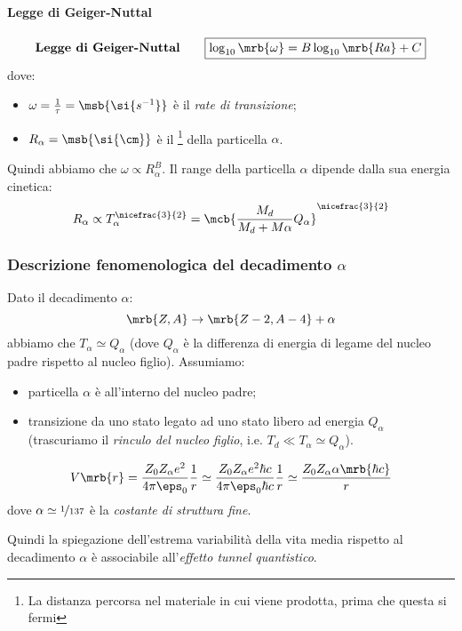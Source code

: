 \paragraph{Legge di Geiger-Nuttal}
\[
  \textbf{Legge di Geiger-Nuttal}\qquad
  \boxed{
    \log_{10} \mrb{\omega} = B \log _{10} \mrb{Ra} + C
  }
\]
dove:
\begin{itemize}
  \item $\omega = \frac{1}{\tau} = \msb{\si{s^{-1}}}$ è il \textit{rate di
    transizione};
  \item $R _{\alpha} = \msb{\si{\cm}}$ è il \textit{}\footnote{
      La distanza percorsa nel materiale in cui viene prodotta, prima che
      questa si fermi
    } della particella $\alpha$.
\end{itemize}
Quindi abbiamo che $\omega \propto R _{\alpha}^{B}$. %
Il range della particella $\alpha$ dipende dalla sua energia cinetica:
\[
  R _{\alpha} \propto T _{\alpha}^{\nicefrac{3}{2}} = \mcb{\frac{M _{d}}{M _{d}
  + M \alpha} Q _{\alpha}}^{\nicefrac{3}{2}}
\]

\subsubsection{Descrizione fenomenologica del decadimento $\alpha$}
Dato il decadimento $\alpha$:
\[
  \mrb{Z, A} \rightarrow \mrb{Z - 2, A - 4} + \alpha
\]
abbiamo che $T _{\alpha} \simeq Q _{\alpha}$ (dove $Q _{\alpha}$ è la
differenza di energia di legame del nucleo padre rispetto al nucleo figlio).
Assumiamo:
\begin{itemize}
  \item particella $\alpha$ è \textit{} all'interno del
    nucleo padre;
  \item transizione da uno stato legato ad uno stato libero ad energia $Q
    _{\alpha}$ (trascuriamo il \textit{rinculo del nucleo figlio}, i.e. $T _{d}
    \ll T _{\alpha} \simeq Q _{\alpha}$).
\end{itemize}


\[
  V \mrb{r} = \frac{Z_0 Z _{\alpha} e^2}{4 \pi \eps_0} \frac{1}{r} \simeq
  \frac{Z_0 Z _{\alpha} e^2 \hbar c}{4 \pi \eps_0 \hbar c} \frac{1}{r} \simeq
  \frac{Z_0 Z _{\alpha} \alpha \mrb{\hbar c}}{r}
\]
dove $\alpha \simeq \nicefrac{1}{137}$ è la \textit{costante di struttura
fine}.

Quindi la spiegazione dell'estrema variabilità della vita media rispetto al
decadimento $\alpha$ è associabile all'\textit{effetto tunnel quantistico}.

